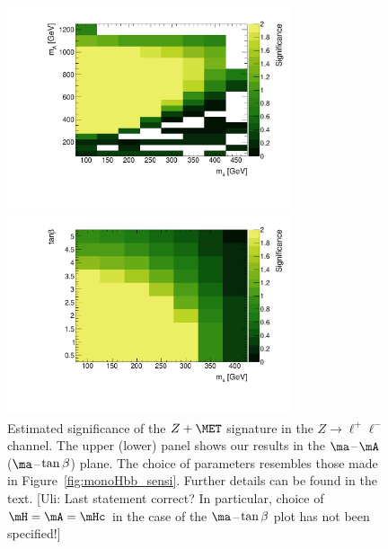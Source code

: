 \begin{figure}[t!]
\centering
\includegraphics[width=0.75\textwidth]{texinputs/04_grid/figures/monoz/leptonic/mAma_Significance_ll.pdf}

\vspace{2mm}

\includegraphics[width=0.75\textwidth]{texinputs/04_grid/figures/monoz/leptonic/tanbma_Significance_ll.pdf}
\vspace{2mm}
\caption{Estimated significance of the $Z+\MET$ signature in the $Z \to \ell^+ \ell^-$ channel. The upper (lower) panel shows our results in the $\ma\hspace{0.25mm}$--$\hspace{0.25mm}\mA$ ($\ma\hspace{0.25mm}$--$\hspace{0.25mm}\tan \beta$) plane. The choice of parameters resembles those made in Figure~\ref{fig:monoHbb_sensi}. Further details can be found in the text. {\color{red} [Uli: Last statement correct? In particular, choice of $\mH = \mA = \mHc$ in the case of the $\ma\hspace{0.25mm}$--$\hspace{0.25mm}\tan \beta$ plot has not been specified!] }}
\label{fig:monoZll_sensi}
\end{figure}

